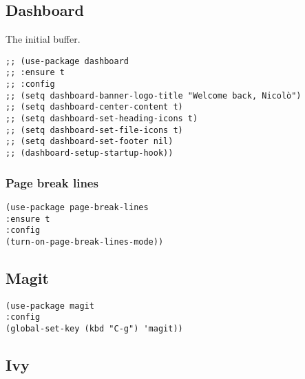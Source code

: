 \documentclass[11pt]{article}
\begin{document}
\subsection{Dashboard}
\label{sec:orgdce6821}
The initial buffer.
\begin{verbatim}
;; (use-package dashboard
;; :ensure t
;; :config
;; (setq dashboard-banner-logo-title "Welcome back, Nicolò")
;; (setq dashboard-center-content t)
;; (setq dashboard-set-heading-icons t)
;; (setq dashboard-set-file-icons t)
;; (setq dashboard-set-footer nil)
;; (dashboard-setup-startup-hook))
\end{verbatim}
\subsubsection{Page break lines}
\label{sec:orge4045a6}

\begin{verbatim}
(use-package page-break-lines
:ensure t
:config
(turn-on-page-break-lines-mode))
\end{verbatim}
\subsection{Magit}
\label{sec:orgd48d6ed}

\begin{verbatim}
(use-package magit
:config
(global-set-key (kbd "C-g") 'magit))
\end{verbatim}

\subsection{Ivy}
\label{sec:org4e4f5fd}
\end{document}
